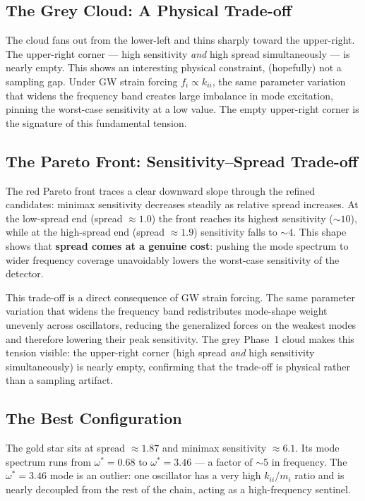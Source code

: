 \documentclass[11pt, letterpaper]{article}
\begin{document}
\subsection{The Grey Cloud: A Physical Trade-off}

The cloud fans out from the lower-left and thins sharply toward the
upper-right.  The upper-right corner --- high sensitivity \emph{and} high
spread simultaneously --- is nearly empty.  This shows an interesting
physical constraint, (hopefully) not a sampling gap.  Under GW strain forcing $f_i
\propto k_{ii}$, the same
parameter variation that widens the frequency band creates large imbalance
in mode excitation, pinning the worst-case sensitivity at a low value.
The empty upper-right corner is the signature of this fundamental tension.

\subsection{The Pareto Front: Sensitivity--Spread Trade-off}

The red Pareto front traces a clear downward slope through the refined
candidates: minimax sensitivity decreases steadily as relative spread
increases.  At the low-spread end (spread $\approx 1.0$) the front reaches
its highest sensitivity ($\sim 10$), while at the high-spread end
(spread $\approx 1.9$) sensitivity falls to $\sim 4$.  This shape shows that
\textbf{spread comes at a genuine cost}: pushing the mode spectrum to wider
frequency coverage unavoidably lowers the worst-case sensitivity of the
detector.

This trade-off is a direct consequence of GW strain forcing.  The same
parameter variation that widens the frequency band redistributes mode-shape
weight unevenly across oscillators, reducing the generalized forces on the
weakest modes and therefore lowering their peak sensitivity.  The grey Phase~1
cloud makes this tension visible: the upper-right corner (high spread
\emph{and} high sensitivity simultaneously) is nearly empty, confirming that
the trade-off is physical rather than a sampling artifact.

\subsection{The Best Configuration}

The gold star sits at spread $\approx 1.87$ and minimax sensitivity
$\approx 6.1$.  Its mode spectrum runs from $\omega^* = 0.68$ to
$\omega^* = 3.46$ --- a factor of $\sim$5 in frequency.  The $\omega^*=3.46$
mode is an outlier: one oscillator has a very high $k_{ii}/m_i$ ratio and is
nearly decoupled from the rest of the chain, acting as a high-frequency
sentinel.
\end{document}
